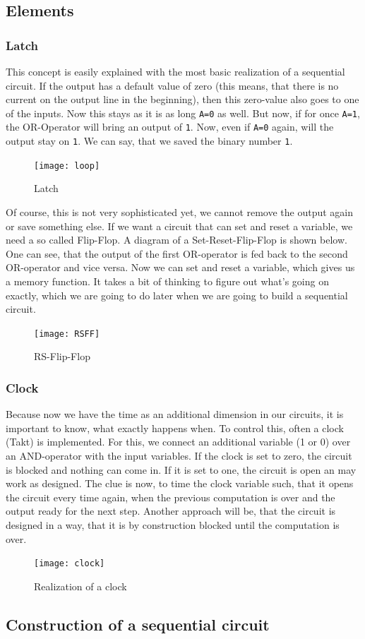 \subsection{Elements}
\subsubsection{Latch}
This concept is easily explained with the most basic realization of a sequential circuit. If the output has a default value of zero (this means, that there is no current on the output line in the beginning), then this zero-value also goes to one of the inputs. Now this stays as it is as long \texttt{A=0} as well. But now, if for once \texttt{A=1}, the OR-Operator will bring an output of \texttt{1}. Now, even if \texttt{A=0} again, will the output stay on \texttt{1}. We can say, that we saved the binary number \texttt{1}.

\begin{figure}[H]
\centering
  \texttt{[image: loop]}%
  \caption{Latch}%
  \label{fig:loop}
\end{figure}

\noindent
Of course, this is not very sophisticated yet, we cannot remove the output again or save something else. If we want a circuit that can set and reset a variable, we need a so called Flip-Flop. A diagram of a Set-Reset-Flip-Flop is shown below. One can see, that the output of the first OR-operator is fed back to the second OR-operator and vice versa. Now we can set and reset a variable, which gives us a memory function. It takes a bit of thinking to figure out what's going on exactly, which we are going to do later when we are going to build a sequential circuit. 

\begin{figure}[H]
\centering
  \texttt{[image: RSFF]}%
  \caption{RS-Flip-Flop}%
  \label{fig:RSFF}
\end{figure}

\subsubsection{Clock}
Because now we have the time as an additional dimension in our circuits, it is important to know, what exactly happens when. To control this, often a clock (Takt) is implemented. For this, we connect an additional variable (1 or 0) over an AND-operator with the input variables. If the clock is set to zero, the circuit is blocked and nothing can come in. If it is set to one, the circuit is open an may work as designed. The clue is now, to time the clock variable such, that it opens the circuit every time again, when the previous computation is over and the output ready for the next step. Another approach will be, that the circuit is designed in a way, that it is by construction blocked until the computation is over.

\begin{figure}[H]
\centering
  \texttt{[image: clock]}%
  \caption{Realization of a clock}%
  \label{fig:clock}
\end{figure}
\subsection{Construction of a sequential circuit}
